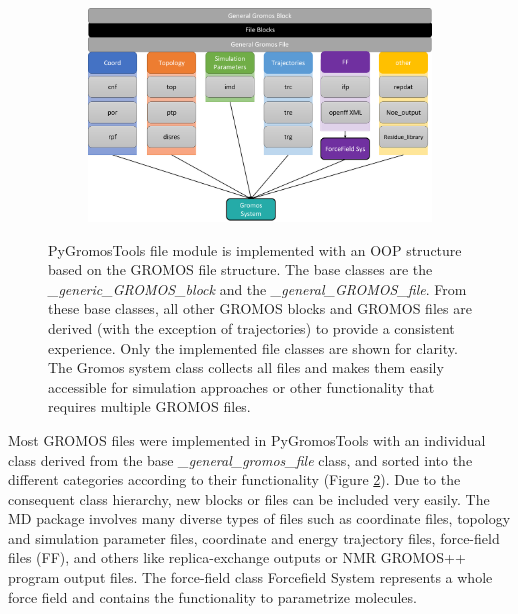 
\begin{figure}[h]
    \centering
    \begin{subfigure}{1\textwidth}
        \includegraphics[width=\textwidth]{fig/implementation/Files.png} 
        \caption{}
        \label{subFig: FilesinModule}
    \end{subfigure}
    \caption{PyGromosTools file module is implemented with an OOP structure based on the GROMOS file structure. The base classes are the \textit{\_generic\_GROMOS\_block} and the \textit{\_general\_GROMOS\_file}. From these base classes, all other GROMOS blocks and GROMOS files are derived (with the exception of trajectories) to provide a consistent experience.
    Only the implemented file classes are shown for clarity. The Gromos system class collects all files and makes them easily accessible for simulation approaches or other functionality that requires multiple GROMOS files.
    }
    \label{fig: FileModule}
\end{figure}


Most GROMOS files were implemented in PyGromosTools with an individual class derived from the base \textit{\_general\_gromos\_file} class, and sorted into the different categories according to their functionality (Figure \ref{fig: FileModule}). Due to the consequent class hierarchy, new blocks or files can be included very easily. 
The MD package involves many diverse types of files such as coordinate files, topology and simulation parameter files, coordinate and energy trajectory files, force-field files (FF), and others like replica-exchange outputs or NMR GROMOS++ program output files. The force-field class Forcefield System represents a whole force field and contains the functionality to parametrize molecules.


